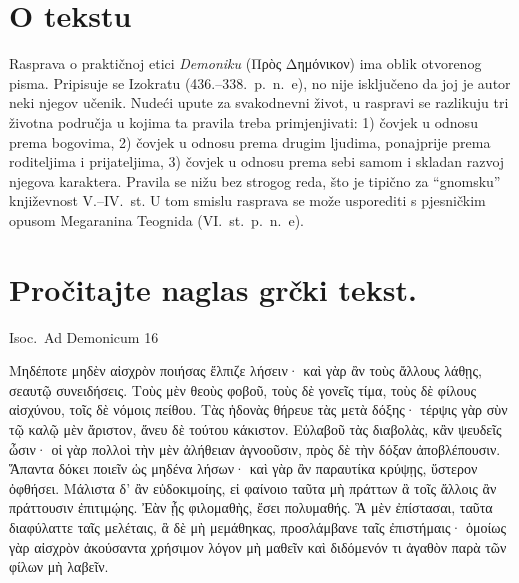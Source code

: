 


\section*{O tekstu}

Rasprava o praktičnoj etici \textit{Demoniku} \textgreek[variant=ancient]{(Πρὸς Δημόνικον)} ima oblik otvorenog pisma. Pripisuje se Izokratu (436.–338.\ p.~n.~e), no nije isključeno da joj je autor neki njegov učenik. Nudeći upute za svakodnevni život, u raspravi se razlikuju tri životna područja u kojima ta pravila treba primjenjivati: 1) čovjek u odnosu prema bogovima, 2) čovjek u odnosu prema drugim ljudima, ponajprije prema roditeljima i prijateljima, 3) čovjek u odnosu prema sebi samom i skladan razvoj njegova karaktera. Pravila se nižu bez strogog reda, što je tipično za ``gnomsku'' književnost V.–IV.~st. U tom smislu rasprava se može usporediti s pjesničkim opusom Megaranina Teognida (VI.~st.\ p.~n.~e).


\section*{Pročitajte naglas grčki tekst.}


Isoc.\ Ad Demonicum 16

\medskip

{\large
\begin{greek}
\noindent Μηδέποτε μηδὲν αἰσχρὸν ποιήσας ἔλπιζε λήσειν· καὶ γὰρ ἂν τοὺς ἄλλους λάθῃς, σεαυτῷ συνειδήσεις. Τοὺς μὲν θεοὺς φοβοῦ, τοὺς δὲ γονεῖς τίμα, τοὺς δὲ φίλους αἰσχύνου, τοῖς δὲ νόμοις πείθου. Τὰς ἡδονὰς θήρευε τὰς μετὰ δόξης· τέρψις γὰρ σὺν τῷ καλῷ μὲν ἄριστον, ἄνευ δὲ τούτου κάκιστον.  Εὐλαβοῦ τὰς διαβολὰς, κἂν ψευδεῖς ὦσιν· οἱ γὰρ πολλοὶ τὴν μὲν ἀλήθειαν ἀγνοοῦσιν, πρὸς δὲ τὴν δόξαν ἀποβλέπουσιν. Ἅπαντα δόκει ποιεῖν ὡς μηδένα λήσων· καὶ γὰρ ἂν παραυτίκα κρύψῃς, ὕστερον ὀφθήσει. Μάλιστα δ' ἂν εὐδοκιμοίης, εἰ φαίνοιο ταῦτα μὴ πράττων ἃ τοῖς ἄλλοις ἂν πράττουσιν ἐπιτιμῴης. Ἐὰν ᾖς φιλομαθὴς, ἔσει πολυμαθής. Ἃ μὲν ἐπίστασαι, ταῦτα διαφύλαττε ταῖς μελέταις, ἃ δὲ μὴ μεμάθηκας, προσλάμβανε ταῖς ἐπιστήμαις· ὁμοίως γὰρ αἰσχρὸν ἀκούσαντα χρήσιμον λόγον μὴ μαθεῖν καὶ διδόμενόν τι ἀγαθὸν παρὰ τῶν φίλων μὴ λαβεῖν.
 
\end{greek}

}

